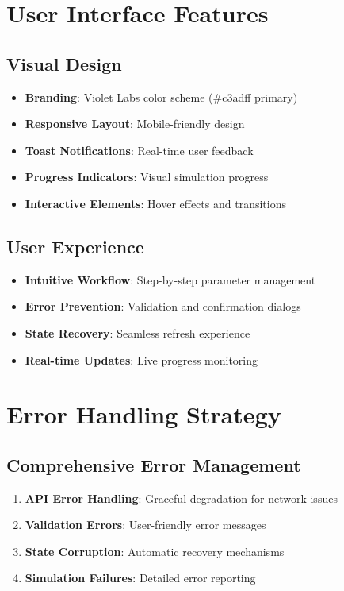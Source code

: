 \documentclass[12pt,a4paper]{article}
\begin{document}
\section{User Interface Features}

\subsection{Visual Design}
\begin{itemize}
    \item \textbf{Branding}: Violet Labs color scheme (\#c3adff primary)
    \item \textbf{Responsive Layout}: Mobile-friendly design
    \item \textbf{Toast Notifications}: Real-time user feedback
    \item \textbf{Progress Indicators}: Visual simulation progress
    \item \textbf{Interactive Elements}: Hover effects and transitions
\end{itemize}

\subsection{User Experience}
\begin{itemize}
    \item \textbf{Intuitive Workflow}: Step-by-step parameter management
    \item \textbf{Error Prevention}: Validation and confirmation dialogs
    \item \textbf{State Recovery}: Seamless refresh experience
    \item \textbf{Real-time Updates}: Live progress monitoring
\end{itemize}

\section{Error Handling Strategy}

\subsection{Comprehensive Error Management}
\begin{enumerate}
    \item \textbf{API Error Handling}: Graceful degradation for network issues
    \item \textbf{Validation Errors}: User-friendly error messages
    \item \textbf{State Corruption}: Automatic recovery mechanisms
    \item \textbf{Simulation Failures}: Detailed error reporting
\end{enumerate}
\end{document}

